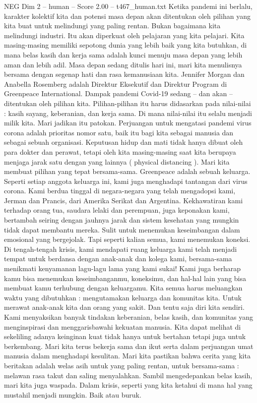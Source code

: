 \begin{textsample}{NEG Dim 2 – human – Score 2.00 – t467\_human.txt}
Ketika pandemi ini berlalu, karakter kolektif kita dan potensi masa depan akan ditentukan oleh pilihan yang kita buat untuk melindungi yang paling rentan.
Bukan bagaimana kita melindungi industri.
Itu akan diperkuat oleh pelajaran yang kita pelajari.
Kita masing-masing memiliki sepotong dunia yang lebih baik yang kita butuhkan, di mana belas kasih dan kerja sama adalah kunci menuju masa depan yang lebih aman dan lebih adil.
Masa depan sedang ditulis hari ini, mari kita menulisnya bersama dengan segenap hati dan rasa kemanusiaan kita.
Jennifer Morgan dan Anabella Rosemberg adalah Direktur Eksekutif dan Direktur Program di Greenpeace International.
Dampak pandemi Covid-19 sedang – dan akan – ditentukan oleh pilihan kita.
Pilihan-pilihan itu harus didasarkan pada nilai-nilai : kasih sayang, keberanian, dan kerja sama.
Di mana nilai-nilai itu selalu menjadi milik kita.
Mari jadikan itu patokan.
Perjuangan untuk mengatasi pandemi virus corona adalah prioritas nomor satu, baik itu bagi kita sebagai manusia dan sebagai sebuah organisasi.
Keputusan hidup dan mati tidak hanya dibuat oleh para dokter dan perawat, tetapi oleh kita masing-masing saat kita berupaya menjaga jarak satu dengan yang lainnya ( physical distancing ).
Mari kita membuat pilihan yang tepat bersama-sama.
Greenpeace adalah sebuah keluarga.
Seperti setiap anggota keluarga ini, kami juga menghadapi tantangan dari virus corona.
Kami berdua tinggal di negara-negara yang telah mengadopsi kami, Jerman dan Prancis, dari Amerika Serikat dan Argentina.
Kekhawatiran kami terhadap orang tua, saudara lelaki dan perempuan, juga keponakan kami, bertambah seiring dengan jauhnya jarak dan sistem kesehatan yang mungkin tidak dapat membantu mereka.
Sulit untuk menemukan keseimbangan dalam emosional yang bergejolak.
Tapi seperti kalian semua, kami menemukan koneksi.
Di tengah-tengah krisis, kami mendapati ruang keluarga kami telah menjadi tempat untuk berdansa dengan anak-anak dan kolega kami, bersama-sama menikmati kenyamanan lagu-lagu lama yang kami sukai!
Kami juga berharap kamu bisa menemukan keseimbanganmu, koneksimu, dan hal-hal lain yang bisa membuat kamu terhubung dengan keluargamu.
Kita semua harus meluangkan waktu yang dibutuhkan : mengutamakan keluarga dan komunitas kita.
Untuk merawat anak-anak kita dan orang yang sakit.
Dan tentu saja diri kita sendiri.
Kami menyaksikan banyak tindakan keberanian, belas kasih, dan komunitas yang menginspirasi dan menggarisbawahi kekuatan manusia.
Kita dapat melihat di sekeliling adanya keinginan kuat tidak hanya untuk bertahan tetapi juga untuk berkembang.
Mari kita terus bekerja sama dan ikut serta dalam perjuangan umat manusia dalam menghadapi kesulitan.
Mari kita pastikan bahwa cerita yang kita beritakan adalah welas asih untuk yang paling rentan, untuk bersama-sama : melawan rasa takut dan saling menyalahkan.
Sambil mengedepankan belas kasih, mari kita juga waspada.
Dalam krisis, seperti yang kita ketahui di mana hal yang mustahil menjadi mungkin.
Baik atau buruk.

\end{textsample}

